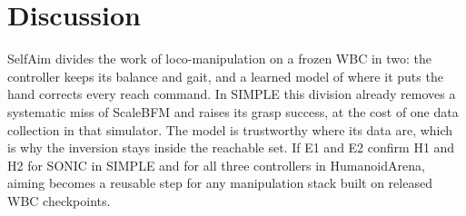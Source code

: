 \documentclass[conference]{IEEEtran}
\begin{document}
\section{Discussion}
SelfAim divides the work of loco-manipulation on a frozen WBC in two: the controller keeps its balance and gait, and a learned model of where it puts the hand corrects every reach command. In SIMPLE this division already removes a systematic miss of ScaleBFM and raises its grasp success, at the cost of one data collection in that simulator. The model is trustworthy where its data are, which is why the inversion stays inside the reachable set. If E1 and E2 confirm H1 and H2 for SONIC in SIMPLE and for all three controllers in HumanoidArena, aiming becomes a reusable step for any manipulation stack built on released WBC checkpoints.




\end{document}
